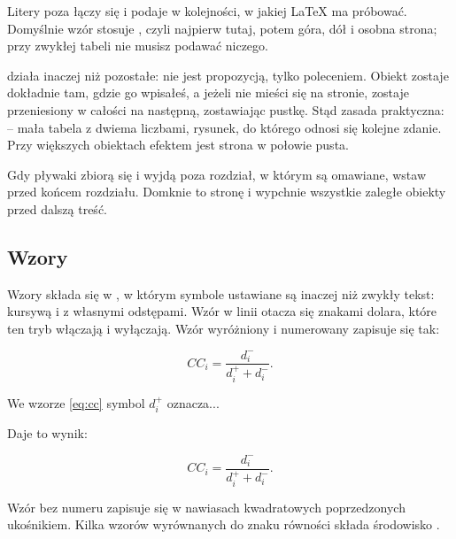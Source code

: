 Litery poza  łączy się i podaje w kolejności, w jakiej LaTeX ma próbować. Domyślnie wzór stosuje , czyli najpierw tutaj, potem góra, dół i osobna strona; przy zwykłej tabeli nie musisz podawać niczego.

 działa inaczej niż pozostałe: nie jest propozycją, tylko poleceniem. Obiekt zostaje dokładnie tam, gdzie go wpisałeś, a jeżeli nie mieści się na stronie, zostaje przeniesiony w całości na następną, zostawiając pustkę. Stąd zasada praktyczna:  -- mała tabela z dwiema liczbami, rysunek, do którego odnosi się kolejne zdanie. Przy większych obiektach efektem jest strona w połowie pusta.

Gdy pływaki zbiorą się i wyjdą poza rozdział, w którym są omawiane, wstaw  przed końcem rozdziału. Domknie to stronę i wypchnie wszystkie zaległe obiekty przed dalszą treść.

\subsection{Wzory}

Wzory składa się w , w którym symbole ustawiane są inaczej niż zwykły tekst: kursywą i z własnymi odstępami. Wzór w linii otacza się znakami dolara, które ten tryb włączają i wyłączają. Wzór wyróżniony i numerowany zapisuje się tak:

\begin{zapis}
\begin{equation}\label{eq:cc}
  CC_i = \frac{d_i^{-}}{d_i^{+} + d_i^{-}}.
\end{equation}

We wzorze \eqref{eq:cc} symbol $d_i^{+}$ oznacza...
\end{zapis}

Daje to wynik:

\begin{equation}\label{eq:cc}
  CC_i = \frac{d_i^{-}}{d_i^{+} + d_i^{-}}.
\end{equation}

Wzór bez numeru zapisuje się w nawiasach kwadratowych poprzedzonych ukośnikiem. Kilka wzorów wyrównanych do znaku równości składa środowisko .

